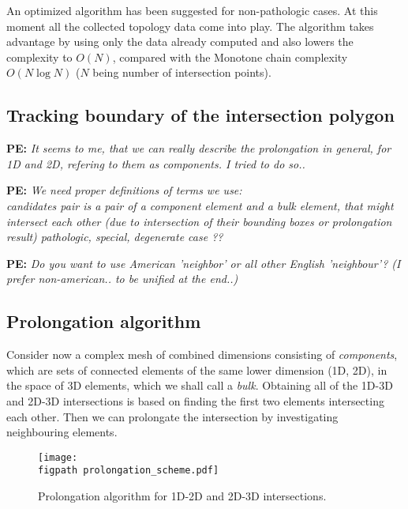\documentclass{elsarticle}
\newcommand{\figpath}{figures/}
\newcommand{\notePE}[1]{{\color{Orange} \textbf{PE: } \textit{#1}}}
\begin{document}
An optimized algorithm has been suggested for non-pathologic cases. At this moment all the collected topology 
data come into play. The algorithm takes advantage by using only the data already computed and also lowers
the complexity to $O(N)$, compared with the Monotone chain complexity $O(N\log N)$ 
($N$ being number of intersection points).


\subsection{Tracking boundary of the intersection polygon}

\notePE{It seems to me, that we can really describe the prolongation in general, for 1D and 2D, 
refering to them as components. I tried to do so..}

\notePE{We need proper definitions of terms we use: \\
\emph{candidates pair}  is a pair of a component element and a bulk element, that might intersect
each other (due to intersection of their bounding boxes or prolongation result)
\emph{pathologic, special, degenerate case ??}
}

\notePE{Do you want to use American 'neighbor' or all other English 'neighbour'? (I prefer non-american.. to be unified at the end..)}

\subsection{Prolongation algorithm}
Consider now a complex mesh of combined dimensions consisting of \emph{components}, which are sets of connected
elements of the same lower dimension (1D, 2D), in the space of 3D elements, which we shall call a \emph{bulk}. 
Obtaining all of the 1D-3D and 2D-3D intersections is based on finding the first two elements intersecting each other.
Then we can prolongate the intersection by investigating neighbouring elements.
%
\begin{figure}[!htb]
  \centering    
    \texttt{[image: \\figpath prolongation\_scheme.pdf]}
  \caption{Prolongation algorithm for 1D-2D and 2D-3D intersections. }
  \label{fig:prolongation}
\end{figure}
\end{document}
